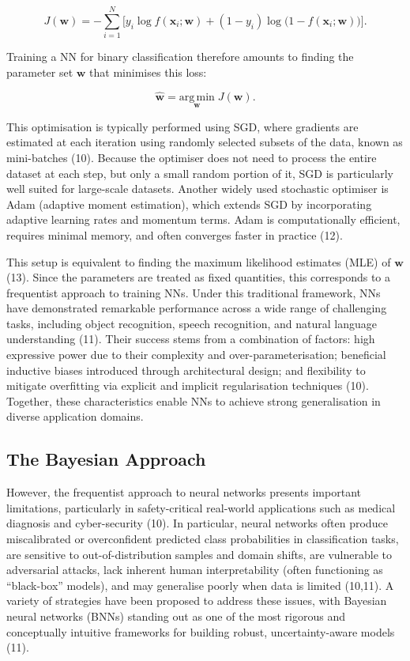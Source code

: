 \documentclass[
  a4paper,
]{scrreprt}
\begin{document}
\[
J(\mathbf{w}) = -\sum_{i=1}^N \big[ y_i \log f(\mathbf{x}_i; \mathbf{w}) + (1-y_i) \log \big( 1 - f(\mathbf{x}_i; \mathbf{w}) \big) \big].
\]

Training a NN for binary classification therefore amounts to finding the
parameter set \(\mathbf{w}\) that minimises this loss:

\[
\hat{\mathbf{w}} = \underset{\mathbf{w}}{\mathrm{arg\,min}} \; J(\mathbf{w}).
\]

This optimisation is typically performed using SGD, where gradients are
estimated at each iteration using randomly selected subsets of the data,
known as mini-batches (10). Because the optimiser does not need to
process the entire dataset at each step, but only a small random portion
of it, SGD is particularly well suited for large-scale datasets. Another
widely used stochastic optimiser is Adam (adaptive moment estimation),
which extends SGD by incorporating adaptive learning rates and momentum
terms. Adam is computationally efficient, requires minimal memory, and
often converges faster in practice (12).

This setup is equivalent to finding the maximum likelihood estimates
(MLE) of \(\mathbf{w}\) (13). Since the parameters are treated as fixed
quantities, this corresponds to a frequentist approach to training NNs.
Under this traditional framework, NNs have demonstrated remarkable
performance across a wide range of challenging tasks, including object
recognition, speech recognition, and natural language understanding
(11). Their success stems from a combination of factors: high expressive
power due to their complexity and over-parameterisation; beneficial
inductive biases introduced through architectural design; and
flexibility to mitigate overfitting via explicit and implicit
regularisation techniques (10). Together, these characteristics enable
NNs to achieve strong generalisation in diverse application domains.

\subsection{The Bayesian Approach}\label{the-bayesian-approach}

However, the frequentist approach to neural networks presents important
limitations, particularly in safety-critical real-world applications
such as medical diagnosis and cyber-security (10). In particular, neural
networks often produce miscalibrated or overconfident predicted class
probabilities in classification tasks, are sensitive to
out-of-distribution samples and domain shifts, are vulnerable to
adversarial attacks, lack inherent human interpretability (often
functioning as ``black-box'' models), and may generalise poorly when
data is limited (10,11). A variety of strategies have been proposed to
address these issues, with Bayesian neural networks (BNNs) standing out
as one of the most rigorous and conceptually intuitive frameworks for
building robust, uncertainty-aware models (11).
\end{document}
